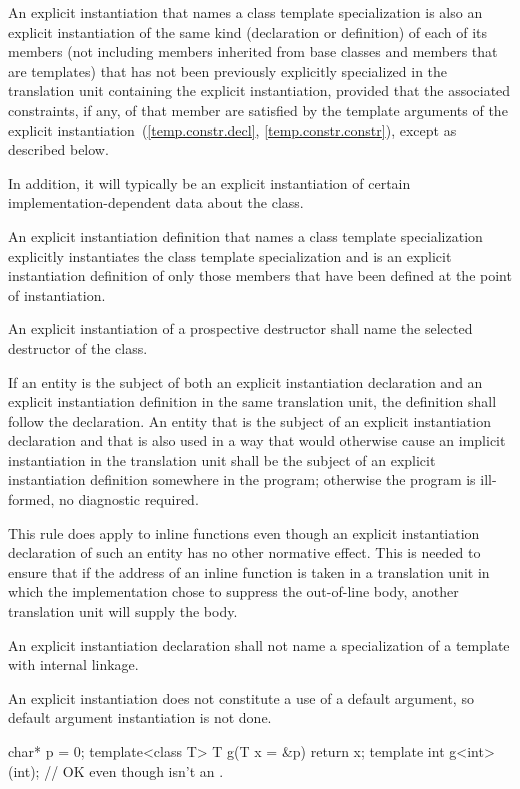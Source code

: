 \pnum
An explicit instantiation that names a class
template specialization is also an explicit
instantiation of the same kind (declaration or definition) of each
of its members (not including members inherited from base classes and members
that are templates) that has not been previously explicitly specialized in
the translation unit containing the explicit instantiation,
provided that the associated constraints, if any,
of that member are satisfied by the template arguments of the explicit
instantiation~(\ref{temp.constr.decl}, \ref{temp.constr.constr}),
except as described below.
\begin{note}
In addition, it will typically be an explicit instantiation of certain
%
implementation-dependent data about the class.
\end{note}

\pnum
An explicit instantiation definition that names a class template
specialization explicitly instantiates the class template specialization
and is an explicit instantiation definition of only those
members that have been defined at the point of instantiation.

\pnum
An explicit instantiation of a prospective destructor
shall name the selected destructor of the class.

\pnum
If an entity is the subject of both an explicit instantiation declaration
and an explicit instantiation definition in the same translation unit, the
definition shall follow the declaration. An entity that is the subject of an
explicit instantiation declaration and that is also used
in a way that would otherwise cause an implicit instantiation
in the translation unit
shall be the subject of an explicit instantiation definition somewhere in the
program; otherwise the program is ill-formed, no diagnostic required.
\begin{note}
This rule does apply to inline functions even though an
explicit instantiation declaration of such an entity has no other normative
effect. This is needed to ensure that if the address of an inline function is
taken in a translation unit in which the implementation chose to suppress the
out-of-line body, another translation unit will supply the body.
\end{note}
An explicit instantiation declaration shall not name a specialization of a
template with internal linkage.

\pnum
An explicit instantiation does not constitute a use of a default argument,
so default argument instantiation is not done.
\begin{example}
\begin{codeblock}
char* p = 0;
template<class T> T g(T x = &p) { return x; }
template int g<int>(int);       // OK even though  isn't an .
\end{codeblock}
\end{example}

